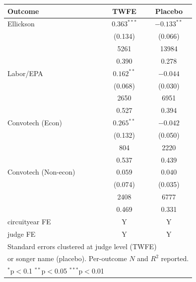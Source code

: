 \begin{tabular}{lcc}
\toprule
Outcome & TWFE & Placebo \\
\midrule
Ellickson & \(0.363^{***}\) & \(-0.133^{**}\) \\
 & (0.134) & (0.066) \\
 & 5261 & 13984 \\
 & 0.390 & 0.278 \\
Labor/EPA & \(0.162^{**}\) & \(-0.044\) \\
 & (0.068) & (0.030) \\
 & 2650 & 6951 \\
 & 0.527 & 0.394 \\
Convotech (Econ) & \(0.265^{**}\) & \(-0.042\) \\
 & (0.132) & (0.050) \\
 & 804 & 2220 \\
 & 0.537 & 0.439 \\
Convotech (Non-econ) & \(0.059\) & \(0.040\) \\
 & (0.074) & (0.035) \\
 & 2408 & 6777 \\
 & 0.469 & 0.331 \\
\midrule
circuityear FE & Y & Y \\
judge FE & Y & Y \\
\bottomrule
\multicolumn{3}{l}{\footnotesize Standard errors clustered at judge level (TWFE)} \\
\multicolumn{3}{l}{\footnotesize or songer name (placebo). Per-outcome \(N\) and \(R^{2}\) reported.} \\
\multicolumn{3}{l}{\footnotesize \(^{*}\)p\(<\)0.1 \(^{**}\)p\(<\)0.05 \(^{***}\)p\(<\)0.01} \\
\end{tabular}
